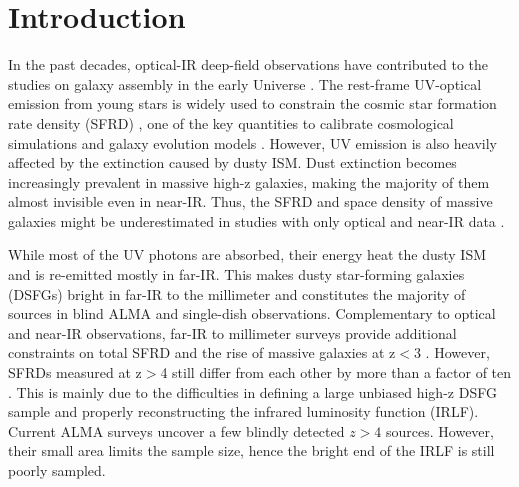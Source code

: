 \documentclass{webofc}
\begin{document}
%
\maketitle
%
\section{Introduction}
\label{intro}
In the past decades, optical-IR deep-field observations have contributed to the studies on galaxy assembly in the early Universe \cite{MD14}. The rest-frame UV-optical emission from young stars is widely used to constrain the cosmic star formation rate density (SFRD) \cite{Bouwens14}, one of the key quantities to calibrate cosmological simulations and galaxy evolution models \cite{Pillepich18}. However, UV emission is also heavily affected by the extinction caused by dusty ISM. Dust extinction becomes increasingly prevalent in massive high-z galaxies, making the majority of them almost invisible even in near-IR. Thus, the SFRD and space density of massive galaxies might be underestimated in studies with only optical and near-IR data \cite{Wang18}.

While most of the UV photons are absorbed, their energy heat the dusty ISM and is re-emitted mostly in far-IR. This makes dusty star-forming galaxies (DSFGs) bright in far-IR to the millimeter and constitutes the majority of sources in blind ALMA and single-dish observations. Complementary to optical and near-IR observations, far-IR to millimeter surveys provide additional constraints on total SFRD and the rise of massive galaxies at z$<$3 \cite{Dunlop17}. However, SFRDs measured at z$>$4 still differ from each other by more than a factor of ten \cite{Gruppioni20, D20, Zavala21}. This is mainly due to the difficulties in defining a large unbiased high-z DSFG sample and properly reconstructing the infrared luminosity function (IRLF). Current ALMA surveys \cite{Gruppioni20, Franco18} uncover a few blindly detected $z>4$ sources. However, their small area limits the sample size, hence the bright end of the IRLF is
still poorly sampled.
\end{document}
